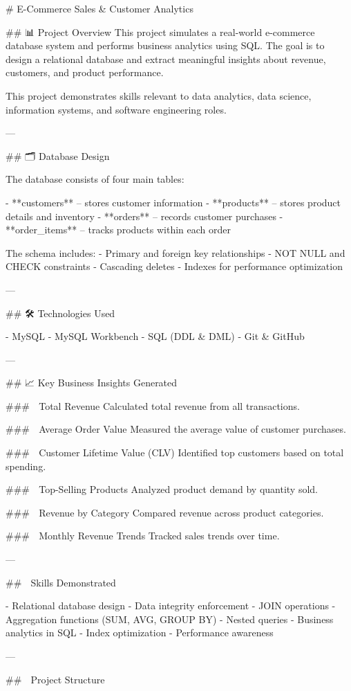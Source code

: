 # E-Commerce Sales & Customer Analytics

## 📊 Project Overview
This project simulates a real-world e-commerce database system and performs business analytics using SQL. The goal is to design a relational database and extract meaningful insights about revenue, customers, and product performance.

This project demonstrates skills relevant to data analytics, data science, information systems, and software engineering roles.

---

## 🗂 Database Design

The database consists of four main tables:

- **customers** – stores customer information  
- **products** – stores product details and inventory  
- **orders** – records customer purchases  
- **order_items** – tracks products within each order  

The schema includes:
- Primary and foreign key relationships
- NOT NULL and CHECK constraints
- Cascading deletes
- Indexes for performance optimization

---

## 🛠 Technologies Used

- MySQL
- MySQL Workbench
- SQL (DDL & DML)
- Git & GitHub

---

## 📈 Key Business Insights Generated

### 🔹 Total Revenue
Calculated total revenue from all transactions.

### 🔹 Average Order Value
Measured the average value of customer purchases.

### 🔹 Customer Lifetime Value (CLV)
Identified top customers based on total spending.

### 🔹 Top-Selling Products
Analyzed product demand by quantity sold.

### 🔹 Revenue by Category
Compared revenue across product categories.

### 🔹 Monthly Revenue Trends
Tracked sales trends over time.

---

## 🧠 Skills Demonstrated

- Relational database design
- Data integrity enforcement
- JOIN operations
- Aggregation functions (SUM, AVG, GROUP BY)
- Nested queries
- Business analytics in SQL
- Index optimization
- Performance awareness

---

## 📂 Project Structure
